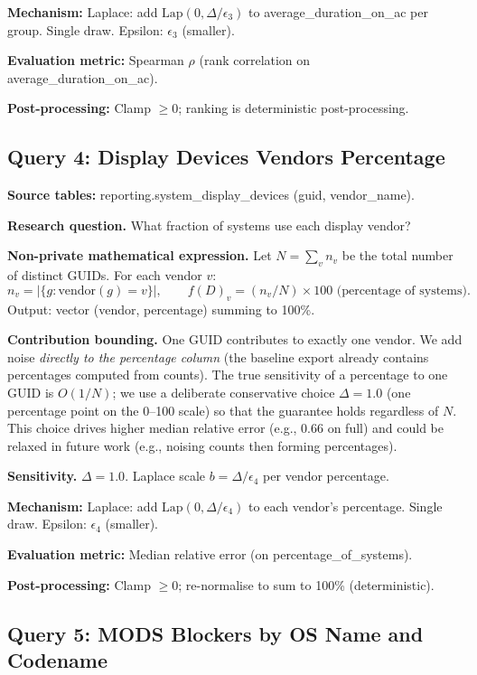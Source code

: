 \documentclass[12pt,letterpaper]{article}
\begin{document}
\textbf{Mechanism:} Laplace: add $\text{Lap}(0, \Delta/\epsilon_3)$ to average\_duration\_on\_ac per group. Single draw. Epsilon: $\epsilon_3$ (smaller).

\textbf{Evaluation metric:} Spearman $\rho$ (rank correlation on average\_duration\_on\_ac).

\textbf{Post-processing:} Clamp $\geq 0$; ranking is deterministic post-processing.

\subsection{Query 4: Display Devices Vendors Percentage}
\label{sec:q4}

\textbf{Source tables:} reporting.system\_display\_devices (guid, vendor\_name).

\textbf{Research question.} What fraction of systems use each display vendor?

\textbf{Non-private mathematical expression.} Let $N = \sum_v n_v$ be the total number of distinct GUIDs. For each vendor $v$:
\[
n_v = |\{g : \text{vendor}(g) = v\}|, \qquad f(D)_v = (n_v / N) \times 100 \text{ (percentage of systems)}.
\]
Output: vector (vendor, percentage) summing to 100\%.

\textbf{Contribution bounding.} One GUID contributes to exactly one vendor. We add noise \emph{directly to the percentage column} (the baseline export already contains percentages computed from counts). The true sensitivity of a percentage to one GUID is $O(1/N)$; we use a deliberate conservative choice $\Delta = 1.0$ (one percentage point on the 0--100 scale) so that the guarantee holds regardless of $N$. This choice drives higher median relative error (e.g., 0.66 on full) and could be relaxed in future work (e.g., noising counts then forming percentages).

\textbf{Sensitivity.} $\Delta = 1.0$. Laplace scale $b = \Delta/\epsilon_4$ per vendor percentage.

\textbf{Mechanism:} Laplace: add $\text{Lap}(0, \Delta/\epsilon_4)$ to each vendor's percentage. Single draw. Epsilon: $\epsilon_4$ (smaller).

\textbf{Evaluation metric:} Median relative error (on percentage\_of\_systems).

\textbf{Post-processing:} Clamp $\geq 0$; re-normalise to sum to 100\% (deterministic).

\subsection{Query 5: MODS Blockers by OS Name and Codename}
\label{sec:q5}
\end{document}
